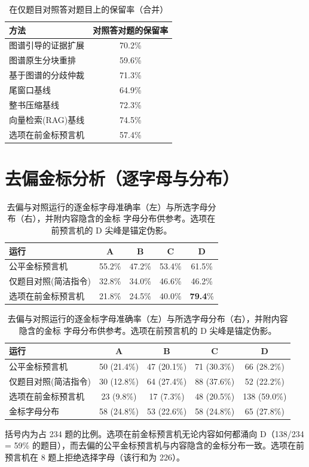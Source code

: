 \documentclass[UTF8,11pt]{ctexart}
\begin{document}
\begin{table}[t]
\centering
\caption{在仅题目对照答对题目上的保留率（合并）}
\label{tab:preserve}
\begin{tabular}{lc}
\toprule
方法 & 对照答对题的保留率 \\
\midrule
图谱引导的证据扩展 & 70.2\% \\
图谱原生分块重排 & 59.6\% \\
基于图谱的分歧仲裁 & 71.3\% \\
尾窗口基线 & 64.9\% \\
整书压缩基线 & 72.3\% \\
向量检索(RAG)基线 & 74.5\% \\
选项在前金标预言机 & 57.4\% \\
\bottomrule
\end{tabular}
\end{table}

\section{去偏金标分析（逐字母与分布）}
\label{sec:danchor-app}
\begin{table}[t]
\centering
\caption{
去偏与对照运行的逐金标字母准确率（左）与所选字母分布（右），并附内容隐含的金标
字母分布供参考。选项在前预言机的 D 尖峰是锚定伪影。
}
\label{tab:danchor}
\small
\begin{tabular}{lcccc}
\toprule
运行 & A & B & C & D \\
\midrule
公平金标预言机 & 55.2\% & 47.2\% & 53.4\% & 61.5\% \\
仅题目对照(简洁指令) & 32.8\% & 34.0\% & 46.6\% & 46.2\% \\
选项在前金标预言机 & 21.8\% & 24.5\% & 40.0\% & \textbf{79.4}\% \\
\bottomrule
\end{tabular}

\vspace{6pt}
\begin{tabular}{lcccc}
\toprule
运行 & A & B & C & D \\
\midrule
公平金标预言机 & 50 (21.4\%) & 47 (20.1\%) & 71 (30.3\%) & 66 (28.2\%) \\
仅题目对照(简洁指令) & 30 (12.8\%) & 64 (27.4\%) & 88 (37.6\%) & 52 (22.2\%) \\
选项在前金标预言机 & 23 (9.8\%) & 17 (7.3\%) & 48 (20.5\%) & 138 (59.0\%) \\
金标字母分布 & 58 (24.8\%) & 53 (22.6\%) & 58 (24.8\%) & 65 (27.8\%) \\
\bottomrule
\end{tabular}

\vspace{2pt}\begin{scriptsize}
括号内为占 234 题的比例。选项在前金标预言机无论内容如何都涌向 D（138/234 =
59\% 的题目），而去偏的公平金标预言机与内容隐含的金标分布一致。选项在前预言机在
8 题上拒绝选择字母（该行和为 226）。
\end{scriptsize}
\end{table}
\end{document}
